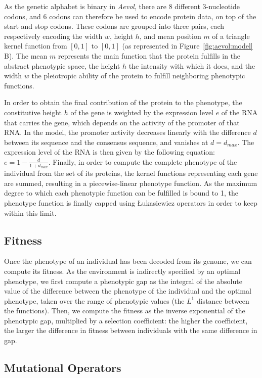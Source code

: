 As the genetic alphabet is binary in \emph{Aevol}, there are 8 different 3-nucleotide codons, and 6 codons can therefore be used to encode protein data, on top of the start and stop codons.
These codons are grouped into three pairs, each respectively encoding the width $w$, height $h$, and mean position $m$ of a triangle kernel function from $[0, 1]$ to $[0, 1]$ (as represented in Figure~\ref{fig:aevol:model} B).
The mean $m$ represents the main function that the protein fulfills in the abstract phenotypic space, the height $h$ the intensity with which it does, and the width $w$ the pleiotropic ability of the protein to fulfill neighboring phenotypic functions.

In order to obtain the final contribution of the protein to the phenotype, the constitutive height $h$ of the gene is weighted by the expression level $e$ of the RNA that carries the gene, which depends on the activity of the promoter of that RNA.
In the model, the promoter activity decreases linearly with the difference $d$ between its sequence and the consensus sequence, and vanishes at $d=d_{max}$.
The expression level of the RNA is then given by the following equation: $e = 1 - \frac{d}{1+d_{max}}$.
Finally, in order to compute the complete phenotype of the individual from the set of its proteins, the kernel functions representing each gene are summed, resulting in a piecewise-linear phenotype function.
As the maximum degree to which each phenotypic function can be fulfilled is bound to 1, the phenotype function is finally capped using Łukasiewicz operators in order to keep within this limit.

\subsection{Fitness}

Once the phenotype of an individual has been decoded from its genome, we can compute its fitness.
As the environment is indirectly specified by an optimal phenotype, we first compute a phenotypic gap as the integral of the absolute value of the difference between the phenotype of the individual and the optimal phenotype, taken over the range of phenotypic values (the $L^1$ distance between the functions).
Then, we compute the fitness as the inverse exponential of the phenotypic gap, multiplied by a selection coefficient: the higher the coefficient, the larger the difference in fitness between individuals with the same difference in gap.

\subsection{Mutational Operators}

